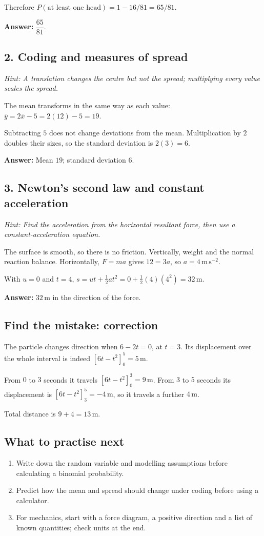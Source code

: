 \documentclass[10pt,a4paper]{article}
\begin{document}
Therefore \(P(\text{at least one head})=1-16/81=65/81\).

\textbf{Answer:} \(\dfrac{65}{81}\).

\subsection*{2. Coding and measures of spread}
\textit{Hint: A translation changes the centre but not the spread; multiplying every value scales the spread.}\par
The mean transforms in the same way as each value: \(\bar y=2\bar x-5=2(12)-5=19\).

Subtracting \(5\) does not change deviations from the mean. Multiplication by \(2\) doubles their sizes, so the standard deviation is \(2(3)=6\).

\textbf{Answer:} Mean \(19\); standard deviation \(6\).

\subsection*{3. Newton's second law and constant acceleration}
\textit{Hint: Find the acceleration from the horizontal resultant force, then use a constant-acceleration equation.}\par
The surface is smooth, so there is no friction. Vertically, weight and the normal reaction balance. Horizontally, \(F=ma\) gives \(12=3a\), so \(a=4\,\mathrm{m\,s^{-2}}\).

With \(u=0\) and \(t=4\), \(s=ut+\tfrac12at^2=0+\tfrac12(4)(4^2)=32\,\mathrm{m}\).

\textbf{Answer:} \(32\,\mathrm{m}\) in the direction of the force.

\subsection*{Find the mistake: correction}
The particle changes direction when \(6-2t=0\), at \(t=3\). Its displacement over the whole interval is indeed \([6t-t^2]_0^5=5\,\mathrm{m}\).

From \(0\) to \(3\) seconds it travels \([6t-t^2]_0^3=9\,\mathrm{m}\). From \(3\) to \(5\) seconds its displacement is \([6t-t^2]_3^5=-4\,\mathrm{m}\), so it travels a further \(4\,\mathrm{m}\).

Total distance is \(9+4=13\,\mathrm{m}\).

\subsection*{What to practise next}\begin{enumerate}
\item Write down the random variable and modelling assumptions before calculating a binomial probability.
\item Predict how the mean and spread should change under coding before using a calculator.
\item For mechanics, start with a force diagram, a positive direction and a list of known quantities; check units at the end.
\end{enumerate}
\end{document}
